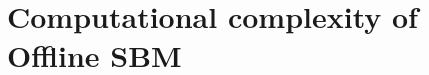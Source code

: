 \documentclass[letterpaper,11pt]{article}
\begin{document}



\section{Computational complexity of Offline SBM}
\end{document}
